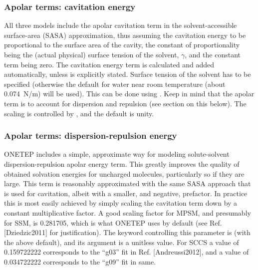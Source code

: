 \documentclass[letterpaper,10pt,english]{sphinxmanual}
\begin{document}
\subsubsection{Apolar terms: cavitation energy}
\label{\detokenize{implicit_solvation_v3:apolar-terms-cavitation-energy}}
All three models include the apolar cavitation term in the
solvent-accessible surface-area (SASA) approximation, thus assuming the
cavitation energy to be proportional to the surface area of the cavity,
the constant of proportionality being the (actual physical) surface
tension of the solvent, \(\gamma\), and the constant term being
zero. The cavitation energy term is calculated and added automatically,
unless  is explicitly stated. Surface tension of
the solvent has to be specified (otherwise the default for water near
room temperature (about 0.074 N/m) will be used). This can be done using
. Keep in mind that the apolar term is
 to account for dispersion and repulsion (see
section on this below). The scaling is controlled by
, and the default is  unity.


\subsubsection{Apolar terms: dispersion-repulsion energy}
\label{\detokenize{implicit_solvation_v3:apolar-terms-dispersion-repulsion-energy}}
ONETEP includes a simple, approximate way for modeling solute-solvent
dispersion-repulsion apolar energy term. This greatly improves the
quality of obtained solvation energies for uncharged molecules,
particularly so if they are large. This term is reasonably approximated
with the same SASA approach that is used for cavitation, albeit with a
smaller, and negative, prefactor. In practice this is most easily
achieved by simply scaling the cavitation term down by a constant
multiplicative factor. A good scaling factor for MPSM, and presumably
for SSM, is 0.281705, which is what ONETEP uses by default (see Ref. {[}Dziedzic2011{]}
for justification). The keyword controlling this parameter is
 (with the above default), and its argument
is a unitless value. For SCCS a value of 0.159722222 corresponds to the
“g03” fit in Ref. {[}Andreussi2012{]}, and a value of 0.034722222 corresponds to the “g09”
fit in same.
\end{document}
